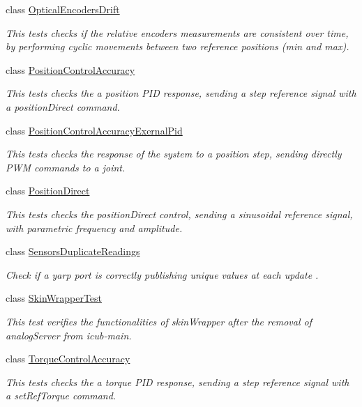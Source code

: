 \begin{DoxyCompactItemize}
class \hyperlink{classOpticalEncodersDrift}{Optical\+Encoders\+Drift}
\begin{DoxyCompactList}\small\item\em This tests checks if the relative encoders measurements are consistent over time, by performing cyclic movements between two reference positions (min and max). \end{DoxyCompactList}\item 
class \hyperlink{classPositionControlAccuracy}{Position\+Control\+Accuracy}
\begin{DoxyCompactList}\small\item\em This tests checks the a position P\+ID response, sending a step reference signal with a position\+Direct command. \end{DoxyCompactList}\item 
class \hyperlink{classPositionControlAccuracyExernalPid}{Position\+Control\+Accuracy\+Exernal\+Pid}
\begin{DoxyCompactList}\small\item\em This tests checks the response of the system to a position step, sending directly P\+WM commands to a joint. \end{DoxyCompactList}\item 
class \hyperlink{classPositionDirect}{Position\+Direct}
\begin{DoxyCompactList}\small\item\em This tests checks the position\+Direct control, sending a sinusoidal reference signal, with parametric frequency and amplitude. \end{DoxyCompactList}\item 
class \hyperlink{classSensorsDuplicateReadings}{Sensors\+Duplicate\+Readings}
\begin{DoxyCompactList}\small\item\em Check if a yarp port is correctly publishing unique values at each update . \end{DoxyCompactList}\item 
class \hyperlink{classSkinWrapperTest}{Skin\+Wrapper\+Test}
\begin{DoxyCompactList}\small\item\em This test verifies the functionalities of skin\+Wrapper after the removal of analog\+Server from icub-\/main. \end{DoxyCompactList}\item 
class \hyperlink{classTorqueControlAccuracy}{Torque\+Control\+Accuracy}
\begin{DoxyCompactList}\small\item\em This tests checks the a torque P\+ID response, sending a step reference signal with a set\+Ref\+Torque command. \end{DoxyCompactList}\item 

\end{DoxyCompactItemize}
